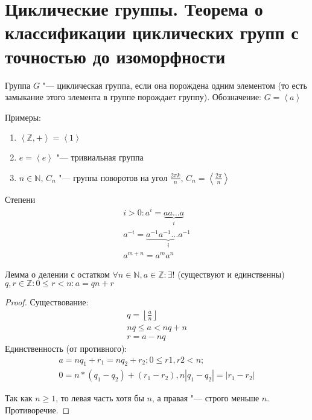 \section{Циклические группы. Теорема о классификации циклических групп с точностью до изоморфности}
\begin{Def}
	Группа $G$ "--- циклическая группа, если она порождена одним элементом (то есть замыкание этого элемента
	в группе порождает группу).
	Обозначение: $G = \left<a\right>$
\end{Def}

Примеры:
\begin{enumerate}
	\item $\left<\mathbb{Z}, +\right> = \left<1\right>$
	\item ${e} = \left<e\right>$ "--- тривиальная группа
	\item $n \in \mathbb{N}$, $C_n$ "--- группа поворотов на угол $\frac{2\pi k}{n}$, $C_n = \left<\frac{2\pi}{n}\right>$
\end{enumerate}

\begin{Def}{Степени}
\begin{gather*}
i > 0: a^i = \underbrace{aa \ldots a}_{i} \\
a^{-i} = \underbrace{a^{-1}a^{-1} \ldots a^{-1}}_{i} \\
a^{m + n} = a^ma^n
\end{gather*}

\end{Def}
\begin{theorem}{Лемма о делении с остатком}
	$\forall n \in \mathbb{N}, a \in \mathbb{Z} \colon \exists!$ (существуют и единственны) $q, r \in \mathbb{Z} \colon 0 \leqslant r < n \colon a = qn + r$
\end{theorem}
\begin{proof}
	Существование:
	\begin{gather*}
	q = \left\lfloor \frac{a}{n} \right\rfloor\\
	nq \leqslant a < nq + n \\
	r = a - nq
	\end{gather*}
	Единственность (от противного):
	\begin{gather*}
	a = nq_1 + r_1 = nq_2 + r_2; 0 \leqslant r1, r2 < n;\\
	0 = n * (q_1 - q_2) + (r_1 - r_2), n|q_1 - q_2| = |r_1 - r_2|
	\end{gather*}

	Так как $n \geqslant 1$, то левая часть хотя бы $n$, а правая "--- строго меньше $n$. Противоречие.
\end{proof}

